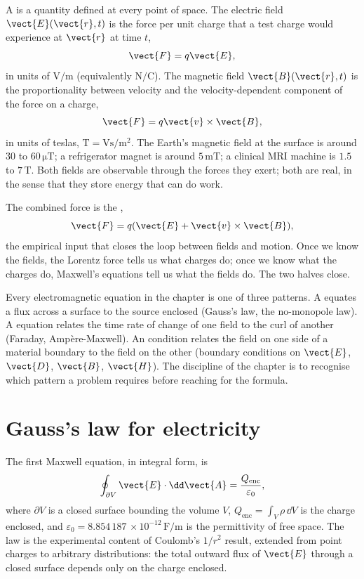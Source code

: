 A  is a quantity defined at every point of space. The
electric field $\vect{E}(\vect{r}, t)$ is the force per unit charge that
a test charge would experience at $\vect{r}$ at time $t$,
\[
\vect{F} = q\vect{E},
\]
in units of $\si{\volt\per\meter}$ (equivalently $\si{\newton\per
\coulomb}$). The magnetic field $\vect{B}(\vect{r}, t)$ is the
proportionality between velocity and the velocity-dependent component
of the force on a charge,
\[
\vect{F} = q\vect{v}\times \vect{B},
\]
in units of teslas, $\si{\tesla} = \si{\volt\second\per\meter\squared}$.
The Earth's magnetic field at the surface is around $30$ to $60\,\si{
\micro\tesla}$; a refrigerator magnet is around $5\,\si{\milli\tesla}$;
a clinical MRI machine is $1.5$ to $7\,\si{\tesla}$. Both fields are
observable through the forces they exert; both are real, in the sense
that they store energy that can do work.



The combined force is the ,
\[
\vect{F} = q(\vect{E} + \vect{v}\times \vect{B}),
\]
the empirical input that closes the loop between fields and motion.
Once we know the fields, the Lorentz force tells us what charges do;
once we know what the charges do, Maxwell's equations tell us what the
fields do. The two halves close.

\begin{archetype}
Every electromagnetic equation in the chapter is one of three patterns.
A  equates a flux across a surface to the source
enclosed (Gauss's law, the no-monopole law). A 
equation relates the time rate of change of one field to the curl of
another (Faraday, Amp\`ere-Maxwell). An  condition
relates the field on one side of a material boundary to the field on
the other (boundary conditions on $\vect{E}$, $\vect{D}$, $\vect{B}$,
$\vect{H}$). The discipline of the chapter is to recognise which
pattern a problem requires before reaching for the formula.
\end{archetype}

\section{Gauss's law for electricity}

The first Maxwell equation, in integral form, is
\[
\oint_{\partial V} \vect{E}\cdot \dd\vect{A} = \frac{Q_{\text{enc}}}{
\varepsilon_{0}},
\]
where $\partial V$ is a closed surface bounding the volume $V$,
$Q_{\text{enc}} = \int_{V}\rho\,\dd V$ is the charge enclosed, and
$\varepsilon_{0} = 8.854\,187\,\times 10^{-12}\,\si{\farad\per\meter}$
is the permittivity of free space. The law is the experimental content
of Coulomb's $1/r^{2}$ result, extended from point charges to arbitrary
distributions: the total outward flux of $\vect{E}$ through a closed
surface depends only on the charge enclosed.

